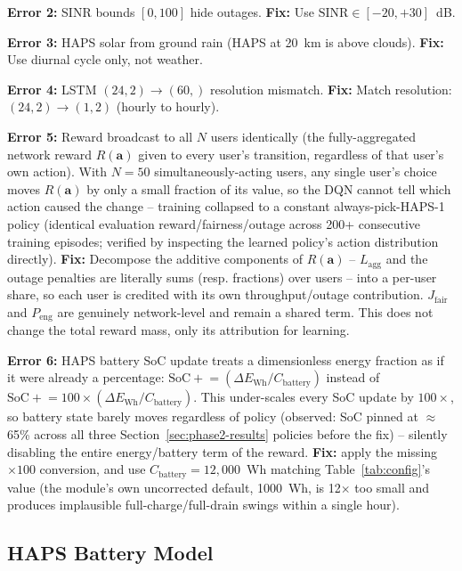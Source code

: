 \documentclass[conference]{IEEEtran}
\begin{document}
\textbf{Error 2:} SINR bounds $[0,100]$ hide outages.
\textbf{Fix:} Use $\text{SINR} \in [-20,+30]$~dB.

\textbf{Error 3:} HAPS solar from ground rain (HAPS at 20~km is above clouds).
\textbf{Fix:} Use diurnal cycle only, not weather.

\textbf{Error 4:} LSTM $(24,2) \to (60,)$ resolution mismatch.
\textbf{Fix:} Match resolution: $(24,2) \to (1,2)$ (hourly to hourly).

\textbf{Error 5:} Reward broadcast to all $N$ users identically (the fully-aggregated
network reward $R(\mathbf{a})$ given to every user's transition, regardless of that
user's own action). With $N=50$ simultaneously-acting users, any single user's choice
moves $R(\mathbf{a})$ by only a small fraction of its value, so the DQN cannot tell
which action caused the change -- training collapsed to a constant always-pick-HAPS-1
policy (identical evaluation reward/fairness/outage across 200+ consecutive training
episodes; verified by inspecting the learned policy's action distribution directly).
\textbf{Fix:} Decompose the additive components of $R(\mathbf{a})$ -- $L_{\text{agg}}$
and the outage penalties are literally sums (resp. fractions) over users -- into a
per-user share, so each user is credited with its own throughput/outage contribution.
$J_{\text{fair}}$ and $P_{\text{eng}}$ are genuinely network-level and remain a shared
term. This does not change the total reward mass, only its attribution for learning.

\textbf{Error 6:} HAPS battery SoC update treats a dimensionless energy fraction as if
it were already a percentage: $\text{SoC} \mathrel{+}= (\Delta E_{\text{Wh}} / C_{\text{battery}})$
instead of $\text{SoC} \mathrel{+}= 100 \times (\Delta E_{\text{Wh}} / C_{\text{battery}})$.
This under-scales every SoC update by $100\times$, so battery state barely moves
regardless of policy (observed: SoC pinned at $\approx$65\% across all three
Section~\ref{sec:phase2-results} policies before the fix) -- silently disabling the
entire energy/battery term of the reward. \textbf{Fix:} apply the missing $\times100$
conversion, and use $C_{\text{battery}}=12{,}000$~Wh matching Table~\ref{tab:config}'s
value (the module's own uncorrected default, 1000~Wh, is 12$\times$ too small and
produces implausible full-charge/full-drain swings within a single hour).

\subsection{HAPS Battery Model}
\end{document}
